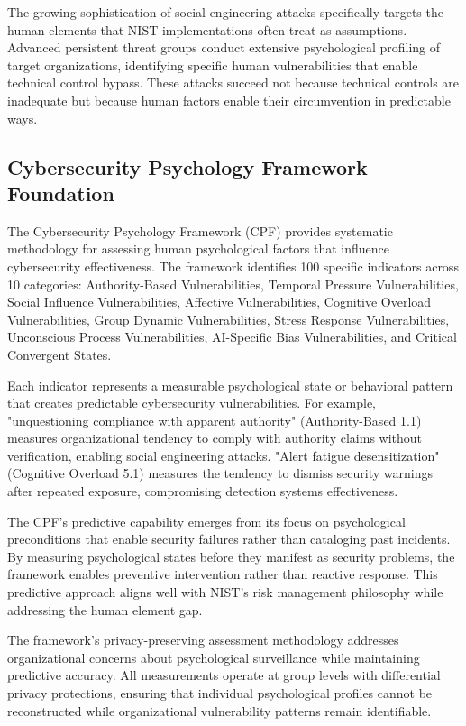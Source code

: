 \documentclass[10pt, twocolumn]{article}
\begin{document}
The growing sophistication of social engineering attacks specifically targets the human elements that NIST implementations often treat as assumptions. Advanced persistent threat groups conduct extensive psychological profiling of target organizations, identifying specific human vulnerabilities that enable technical control bypass. These attacks succeed not because technical controls are inadequate but because human factors enable their circumvention in predictable ways.

\subsection{Cybersecurity Psychology Framework Foundation}

The Cybersecurity Psychology Framework (CPF) provides systematic methodology for assessing human psychological factors that influence cybersecurity effectiveness\cite{canale2024}. The framework identifies 100 specific indicators across 10 categories: Authority-Based Vulnerabilities, Temporal Pressure Vulnerabilities, Social Influence Vulnerabilities, Affective Vulnerabilities, Cognitive Overload Vulnerabilities, Group Dynamic Vulnerabilities, Stress Response Vulnerabilities, Unconscious Process Vulnerabilities, AI-Specific Bias Vulnerabilities, and Critical Convergent States.

Each indicator represents a measurable psychological state or behavioral pattern that creates predictable cybersecurity vulnerabilities. For example, "unquestioning compliance with apparent authority" (Authority-Based 1.1) measures organizational tendency to comply with authority claims without verification, enabling social engineering attacks. "Alert fatigue desensitization" (Cognitive Overload 5.1) measures the tendency to dismiss security warnings after repeated exposure, compromising detection systems effectiveness.

The CPF's predictive capability emerges from its focus on psychological preconditions that enable security failures rather than cataloging past incidents. By measuring psychological states before they manifest as security problems, the framework enables preventive intervention rather than reactive response. This predictive approach aligns well with NIST's risk management philosophy while addressing the human element gap.

The framework's privacy-preserving assessment methodology addresses organizational concerns about psychological surveillance while maintaining predictive accuracy. All measurements operate at group levels with differential privacy protections, ensuring that individual psychological profiles cannot be reconstructed while organizational vulnerability patterns remain identifiable.
\end{document}

